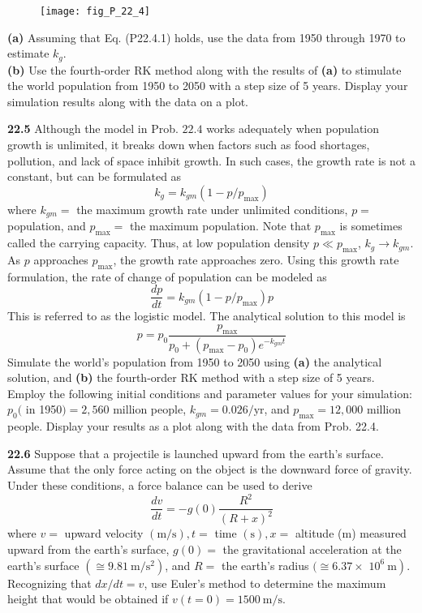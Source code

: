 \documentclass[../main.tex]{subfiles}
\begin{document}
\begin{multicols}{2}
    \begin{figure}[H]
        \centering
        \texttt{[image: fig\_P\_22\_4]}
    \end{figure}
    
    \noindent\textbf{(a)} Assuming that Eq. (P22.4.1) holds, use the data from
    1950 through 1970 to estimate $k_g$.\\
    \textbf{(b)} Use the fourth-order RK method along with the results of \textbf{(a)} to stimulate the world population from 1950 to 2050 with a step size of 5 years. Display your simulation results along with the data on a plot.\vspace{2mm}

    \noindent\textbf{22.5} Although the model in Prob. $22.4$ works adequately when population growth is unlimited, it breaks down when factors such as food shortages, pollution, and lack of space inhibit growth. In such cases, the growth rate is not a constant, but can be formulated as
    $$
    k_{g}=k_{g m}\left(1-p / p_{\max }\right)
    $$
    where $k_{g m}=$ the maximum growth rate under unlimited conditions, $p=$ population, and $p_{\max }=$ the maximum population. Note that $p_{\max }$ is sometimes called the carrying capacity. Thus, at low population density $p \ll p_{\max }$, $k_{g} \rightarrow k_{g m}$. As $p$ approaches $p_{\max }$, the growth rate approaches zero. Using this growth rate formulation, the rate of change of population can be modeled as
    $$
    \frac{d p}{d t}=k_{g m}\left(1-p / p_{\max }\right) p
    $$ This is referred to as the logistic model. The analytical solution to this model is
    $$
    p=p_{0} \frac{p_{\max }}{p_{0}+\left(p_{\max }-p_{0}\right) e^{-k_{g m} t}}
    $$
    Simulate the world's population from 1950 to 2050 using \textbf{(a)} the analytical solution, and \textbf{(b)} the fourth-order RK method with a step size of 5 years. Employ the following initial conditions and parameter values for your simulation: $p_{0}($ in 1950$)=2,560$ million people, $k_{g m}=0.026 / \mathrm{yr}$, and $p_{\max }=12,000$ million people. Display your results as a plot along with the data from Prob. 22.4.\vspace{2mm}

    \noindent\textbf{22.6} Suppose that a projectile is launched upward from the earth's surface. Assume that the only force acting on the object is the downward force of gravity. Under these conditions, a force balance can be used to derive
    $$
    \frac{d v}{d t}=-g(0) \frac{R^{2}}{(R+x)^{2}}
    $$
    where $v=$ upward velocity $(\mathrm{m} / \mathrm{s}), t=$ time $(\mathrm{s}), x=$ altitude (m) measured upward from the earth's surface, $g(0)=$ the gravitational acceleration at the earth's surface $\left(\cong 9.81 \mathrm{~m} / \mathrm{s}^{2}\right)$, and $R=$ the earth's radius $(\cong 6.37 \times$ $\left.10^{6} \mathrm{~m}\right)$. Recognizing that $d x / d t=v$, use Euler's method to determine the maximum height that would be obtained if $v(t=0)=1500 \mathrm{~m} / \mathrm{s}$.\vspace{2mm}


\end{multicols}
\end{document}

